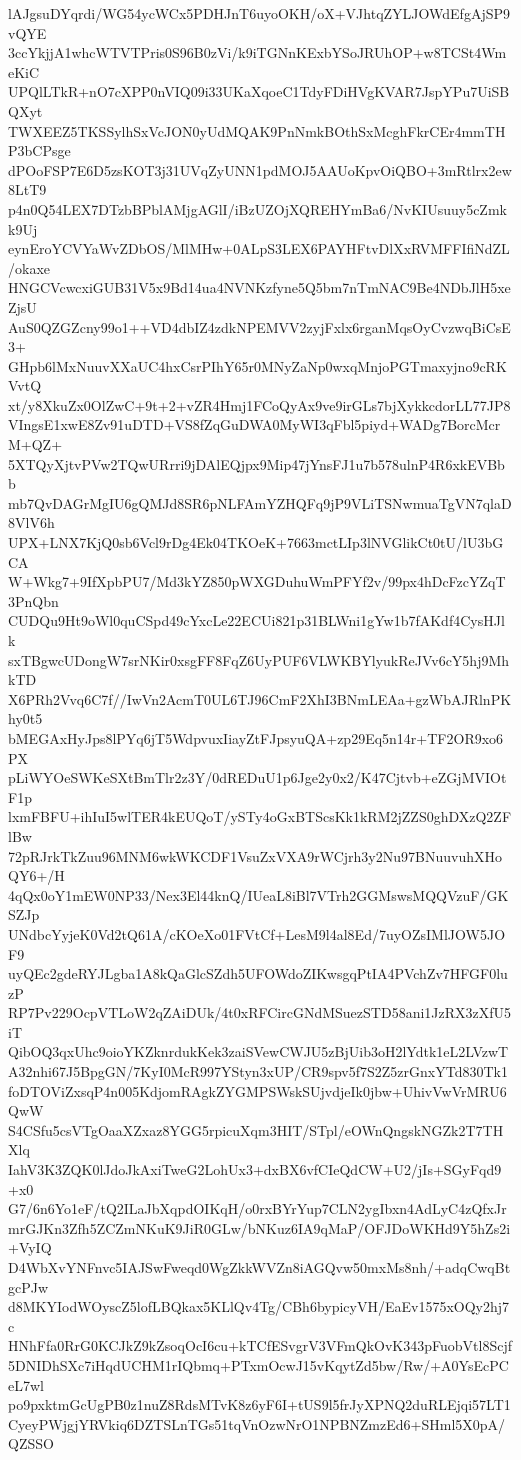 lAJgsuDYqrdi/WG54ycWCx5PDHJnT6uyoOKH/oX+VJhtqZYLJOWdEfgAjSP9vQYE
3ccYkjjA1whcWTVTPris0S96B0zVi/k9iTGNnKExbYSoJRUhOP+w8TCSt4WmeKiC
UPQlLTkR+nO7cXPP0nVIQ09i33UKaXqoeC1TdyFDiHVgKVAR7JspYPu7UiSBQXyt
TWXEEZ5TKSSylhSxVcJON0yUdMQAK9PnNmkBOthSxMcghFkrCEr4mmTHP3bCPsge
dPOoFSP7E6D5zsKOT3j31UVqZyUNN1pdMOJ5AAUoKpvOiQBO+3mRtlrx2ew8LtT9
p4n0Q54LEX7DTzbBPblAMjgAGlI/iBzUZOjXQREHYmBa6/NvKIUsuuy5cZmkk9Uj
eynEroYCVYaWvZDbOS/MlMHw+0ALpS3LEX6PAYHFtvDlXxRVMFFIfiNdZL/okaxe
HNGCVcwcxiGUB31V5x9Bd14ua4NVNKzfyne5Q5bm7nTmNAC9Be4NDbJlH5xeZjsU
AuS0QZGZcny99o1++VD4dbIZ4zdkNPEMVV2zyjFxlx6rganMqsOyCvzwqBiCsE3+
GHpb6lMxNuuvXXaUC4hxCsrPIhY65r0MNyZaNp0wxqMnjoPGTmaxyjno9cRKVvtQ
xt/y8XkuZx0OlZwC+9t+2+vZR4Hmj1FCoQyAx9ve9irGLs7bjXykkcdorLL77JP8
VIngsE1xwE8Zv91uDTD+VS8fZqGuDWA0MyWI3qFbl5piyd+WADg7BorcMcrM+QZ+
5XTQyXjtvPVw2TQwURrri9jDAlEQjpx9Mip47jYnsFJ1u7b578ulnP4R6xkEVBbb
mb7QvDAGrMgIU6gQMJd8SR6pNLFAmYZHQFq9jP9VLiTSNwmuaTgVN7qlaD8VlV6h
UPX+LNX7KjQ0sb6Vcl9rDg4Ek04TKOeK+7663mctLIp3lNVGlikCt0tU/lU3bGCA
W+Wkg7+9IfXpbPU7/Md3kYZ850pWXGDuhuWmPFYf2v/99px4hDcFzcYZqT3PnQbn
CUDQu9Ht9oWl0quCSpd49cYxcLe22ECUi821p31BLWni1gYw1b7fAKdf4CysHJlk
sxTBgwcUDongW7srNKir0xsgFF8FqZ6UyPUF6VLWKBYlyukReJVv6cY5hj9MhkTD
X6PRh2Vvq6C7f//IwVn2AcmT0UL6TJ96CmF2XhI3BNmLEAa+gzWbAJRlnPKhy0t5
bMEGAxHyJps8lPYq6jT5WdpvuxIiayZtFJpsyuQA+zp29Eq5n14r+TF2OR9xo6PX
pLiWYOeSWKeSXtBmTlr2z3Y/0dREDuU1p6Jge2y0x2/K47Cjtvb+eZGjMVIOtF1p
lxmFBFU+ihIuI5wlTER4kEUQoT/ySTy4oGxBTScsKk1kRM2jZZS0ghDXzQ2ZFlBw
72pRJrkTkZuu96MNM6wkWKCDF1VsuZxVXA9rWCjrh3y2Nu97BNuuvuhXHoQY6+/H
4qQx0oY1mEW0NP33/Nex3El44knQ/IUeaL8iBl7VTrh2GGMswsMQQVzuF/GKSZJp
UNdbcYyjeK0Vd2tQ61A/cKOeXo01FVtCf+LesM9l4al8Ed/7uyOZsIMlJOW5JOF9
uyQEc2gdeRYJLgba1A8kQaGlcSZdh5UFOWdoZIKwsgqPtIA4PVchZv7HFGF0luzP
RP7Pv229OcpVTLoW2qZAiDUk/4t0xRFCircGNdMSuezSTD58ani1JzRX3zXfU5iT
QibOQ3qxUhc9oioYKZknrdukKek3zaiSVewCWJU5zBjUib3oH2lYdtk1eL2LVzwT
A32nhi67J5BpgGN/7KyI0McR997YStyn3xUP/CR9spv5f7S2Z5zrGnxYTd830Tk1
foDTOViZxsqP4n005KdjomRAgkZYGMPSWskSUjvdjeIk0jbw+UhivVwVrMRU6QwW
S4CSfu5csVTgOaaXZxaz8YGG5rpicuXqm3HIT/STpl/eOWnQngskNGZk2T7THXlq
IahV3K3ZQK0lJdoJkAxiTweG2LohUx3+dxBX6vfCIeQdCW+U2/jIs+SGyFqd9+x0
G7/6n6Yo1eF/tQ2ILaJbXqpdOIKqH/o0rxBYrYup7CLN2ygIbxn4AdLyC4zQfxJr
mrGJKn3Zfh5ZCZmNKuK9JiR0GLw/bNKuz6IA9qMaP/OFJDoWKHd9Y5hZs2i+VyIQ
D4WbXvYNFnvc5IAJSwFweqd0WgZkkWVZn8iAGQvw50mxMs8nh/+adqCwqBtgcPJw
d8MKYIodWOyscZ5lofLBQkax5KLlQv4Tg/CBh6bypicyVH/EaEv1575xOQy2hj7c
HNhFfa0RrG0KCJkZ9kZsoqOcI6cu+kTCfESvgrV3VFmQkOvK343pFuobVtl8Scjf
5DNIDhSXc7iHqdUCHM1rIQbmq+PTxmOcwJ15vKqytZd5bw/Rw/+A0YsEcPCeL7wl
po9pxktmGcUgPB0z1nuZ8RdsMTvK8z6yF6I+tUS9l5frJyXPNQ2duRLEjqi57LT1
CyeyPWjgjYRVkiq6DZTSLnTGs51tqVnOzwNrO1NPBNZmzEd6+SHml5X0pA/QZSSO
